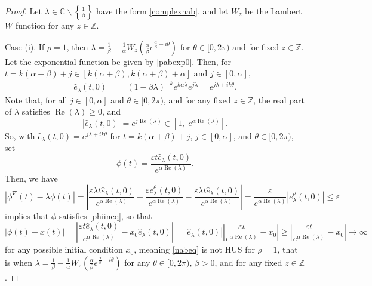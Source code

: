 \documentclass[10pt,a4paper]{amsart}
\newcommand{\C}{\ensuremath{\mathbb{C}}}
\newcommand{\Z}{\ensuremath{\mathbb{Z}}}
\begin{document}
\begin{proof}
Let $\lambda\in\C\backslash\left\{\frac{1}{\beta}\right\}$ have the form \eqref{complexnab}, and let $W_z$ be the Lambert $W$ function for any $z\in\Z$. 

Case (i). If $\rho=1$, then $\lambda=\frac{1}{\beta}-\frac{1}{\alpha}W_z\left(\frac{\alpha}{\beta}e^{\frac{\alpha}{\beta}-i\theta}\right)$ for $\theta\in[0,2\pi)$ and for fixed $z\in\Z$. Let the exponential function be given by \eqref{pabexp0}. Then, for $t=k(\alpha+\beta)+j\in[k(\alpha+\beta),k(\alpha+\beta)+\alpha]$ and $j\in[0,\alpha]$, 
\begin{eqnarray*}
 \widehat{e}_{\lambda}(t,0) &=& (1-\beta\lambda)^{-k}e^{k\alpha\lambda} e^{j\lambda} = e^{j\lambda+ik\theta}.
\end{eqnarray*}
Note that, for all $j\in[0,\alpha]$ and $\theta\in[0,2\pi)$, and for any fixed $z\in\Z$, the real part of $\lambda$ satisfies $\operatorname{Re}(\lambda)\ge 0$, and
\[ |\widehat{e}_{\lambda}(t,0) | = e^{j\operatorname{Re}(\lambda)}\in\left[1,\;e^{\alpha\operatorname{Re}(\lambda)}\right]. \]
So, with $\widehat{e}_{\lambda}(t,0)=e^{j\lambda+ik\theta}$ for $t=k(\alpha+\beta)+j$, $j\in[0,\alpha]$, and $\theta\in[0,2\pi)$, set 
\[ \phi(t)=\frac{\varepsilon t\widehat{e}_{\lambda}(t,0)}{e^{\alpha\operatorname{Re}(\lambda)}}. \]
Then, we have
$$ |\phi^{\nabla}(t)-\lambda \phi(t)| = \left|\frac{\varepsilon\lambda t\widehat{e}_{\lambda}(t,0)}{e^{\alpha\operatorname{Re}(\lambda)}}+\frac{\varepsilon e^{\rho}_{\lambda}(t,0)}{e^{\alpha\operatorname{Re}(\lambda)}}-\frac{\varepsilon\lambda t\widehat{e}_{\lambda}(t,0)}{e^{\alpha\operatorname{Re}(\lambda)}}\right| = \frac{\varepsilon}{e^{\alpha\operatorname{Re}(\lambda)}}|e^{\rho}_{\lambda}(t,0)|\le \varepsilon $$
implies that $\phi$ satisfies \eqref{phiineq}, so that
$$ |\phi(t)-x(t)| = \left|\frac{\varepsilon t\widehat{e}_{\lambda}(t,0)}{e^{\alpha\operatorname{Re}(\lambda)}}-x_0\widehat{e}_{\lambda}(t,0)\right| = |\widehat{e}_{\lambda}(t,0)|\left|\frac{\varepsilon t}{e^{\alpha\operatorname{Re}(\lambda)}} - x_0\right|\ge \left|\frac{\varepsilon t}{e^{\alpha\operatorname{Re}(\lambda)}} - x_0\right| \rightarrow\infty $$
for any possible initial condition $x_0$, meaning \eqref{nabeq} is not HUS for $\rho=1$, that is when $\lambda=\frac{1}{\beta}-\frac{1}{\alpha}W_z\left(\frac{\alpha}{\beta}e^{\frac{\alpha}{\beta}-i\theta}\right)$ for any $\theta\in[0,2\pi)$, $\beta>0$, and for any fixed $z\in\Z$.


\end{proof}
\end{document}
